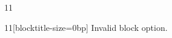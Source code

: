 \documentclass[paper=A4]{ropas-poster}
\begin{document}
\begin{postergrid}{1}{1}
\begin{posterblock}{1}{1}[blocktitle-size=0bp]
Invalid block option.
\end{posterblock}
\end{postergrid}
\end{document}
